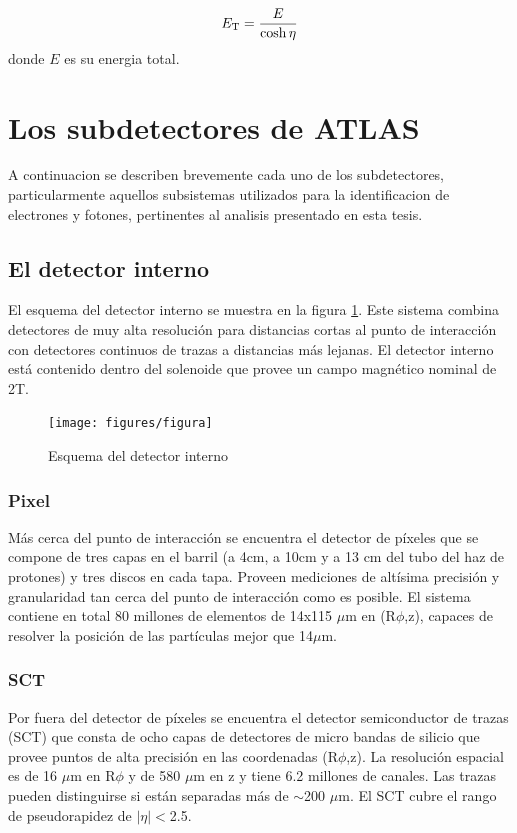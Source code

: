 \begin{equation}
  \et = \frac{E}{\cosh \eta}
\end{equation}
%
donde $E$ es su energia total.


\section{Los subdetectores de ATLAS}

A continuacion se describen brevemente cada uno de los subdetectores,
particularmente aquellos subsistemas utilizados para la identificacion de
electrones y fotones, pertinentes al analisis presentado en esta tesis.

\subsection{El detector interno}

El esquema del detector interno se muestra en la figura
\ref{fig:innerdetector}\cite{IDTDR}. Este sistema combina detectores de muy alta
resolución para distancias cortas al punto de interacción con detectores
continuos de trazas a distancias más lejanas. El detector interno está contenido
dentro del solenoide que provee un campo magnético nominal de 2T.

\begin{figure}[H]
  \centering \texttt{[image: figures/figura]}
  \caption{Esquema del detector interno}\label{fig:innerdetector}
\end{figure}

\subsubsection{Pixel}
Más cerca del punto de interacción se encuentra el detector de píxeles que se
compone de tres capas en el barril (a 4cm, a 10cm y a 13 cm del tubo del haz de
protones) y tres discos en cada tapa. Proveen mediciones de altísima precisión y
granularidad tan cerca del punto de interacción como es posible. El sistema
contiene en total 80 millones de elementos de 14x115 $\mu$m en (R$\phi$,z),
capaces de resolver la posición de las partículas mejor que 14$\mu$m.

\subsubsection{SCT}
Por fuera del detector de píxeles se encuentra el detector semiconductor de
trazas (SCT) que consta de ocho capas de detectores de micro bandas de silicio
que provee puntos de alta precisión en las coordenadas (R$\phi$,z). La
resolución espacial es de 16 $\mu$m en R$\phi$ y de 580 $\mu$m en z y tiene 6.2
millones de canales. Las trazas pueden distinguirse si están separadas más de
$\sim$200 $ \mu$m. El SCT cubre el rango de pseudorapidez de $|\eta|<$2.5.


